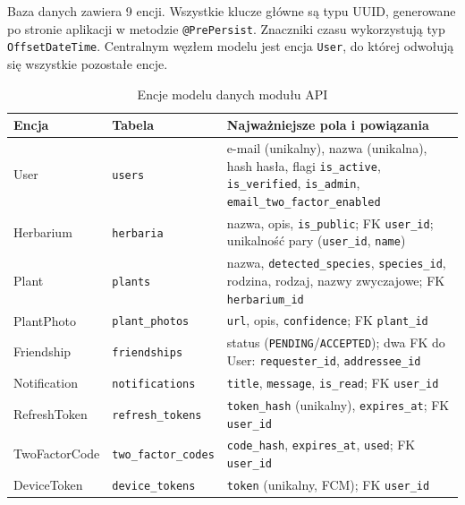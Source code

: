 \documentclass[12pt,a4paper]{article}
\begin{document}
Baza danych zawiera 9 encji. Wszystkie klucze g\l{}\'owne s\k{a} typu UUID, generowane po stronie aplikacji w metodzie \texttt{@PrePersist}. Znaczniki czasu wykorzystuj\k{a} typ \texttt{OffsetDateTime}. Centralnym w\k{e}z\l{}em modelu jest encja \texttt{User}, do kt\'orej odwo\l{}uj\k{a} si\k{e} wszystkie pozosta\l{}e encje.

\begin{table}[htbp]
\centering
\caption{Encje modelu danych modu\l{}u API}
\label{tab:encje}
\vspace{0.3em}
\begin{small}
\begin{tabularx}{\textwidth}{@{}llX@{}}
\toprule
\textbf{Encja} & \textbf{Tabela} & \textbf{Najwa\.zniejsze pola i powi\k{a}zania} \\
\midrule
User & \texttt{users} & e-mail (unikalny), nazwa (unikalna), hash has\l{}a, flagi \texttt{is\_active}, \texttt{is\_verified}, \texttt{is\_admin}, \texttt{email\_two\_factor\_enabled} \\ \addlinespace
Herbarium & \texttt{herbaria} & nazwa, opis, \texttt{is\_public}; FK \texttt{user\_id}; unikalno\'s\'c pary (\texttt{user\_id}, \texttt{name}) \\ \addlinespace
Plant & \texttt{plants} & nazwa, \texttt{detected\_species}, \texttt{species\_id}, rodzina, rodzaj, nazwy zwyczajowe; FK \texttt{herbarium\_id} \\ \addlinespace
PlantPhoto & \texttt{plant\_photos} & \texttt{url}, opis, \texttt{confidence}; FK \texttt{plant\_id} \\ \addlinespace
Friendship & \texttt{friendships} & status (\texttt{PENDING}/\texttt{ACCEPTED}); dwa FK do User: \texttt{requester\_id}, \texttt{addressee\_id} \\ \addlinespace
Notification & \texttt{notifications} & \texttt{title}, \texttt{message}, \texttt{is\_read}; FK \texttt{user\_id} \\ \addlinespace
RefreshToken & \texttt{refresh\_tokens} & \texttt{token\_hash} (unikalny), \texttt{expires\_at}; FK \texttt{user\_id} \\ \addlinespace
TwoFactorCode & \texttt{two\_factor\_codes} & \texttt{code\_hash}, \texttt{expires\_at}, \texttt{used}; FK \texttt{user\_id} \\ \addlinespace
DeviceToken & \texttt{device\_tokens} & \texttt{token} (unikalny, FCM); FK \texttt{user\_id} \\
\bottomrule
\end{tabularx}
\end{small}
\end{table}
\end{document}
